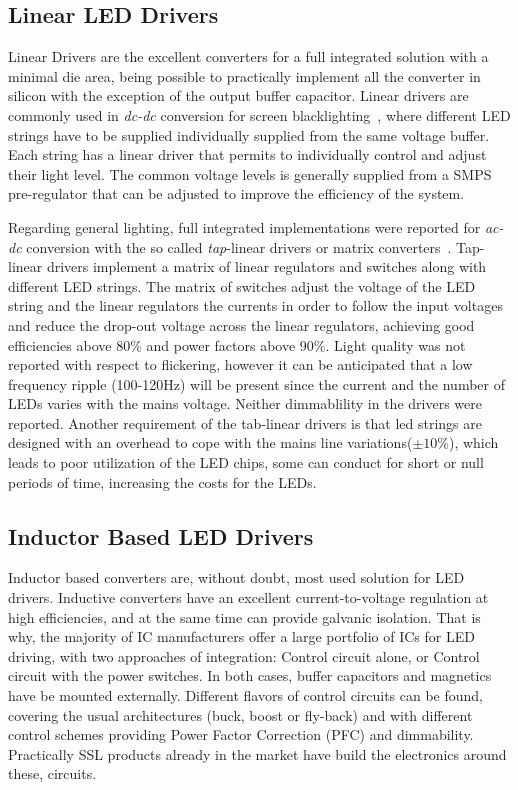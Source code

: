 \subsection{Linear LED Drivers}
Linear Drivers are the excellent converters for a full integrated solution with a minimal die area, being possible to practically implement all the converter in silicon with the exception of the output buffer capacitor. Linear drivers are commonly used in \emph{dc-dc} conversion for screen blacklighting~\cite{2007Sang-Yun,2008Tseng,2008Yuequan}, where different LED strings have to be supplied individually supplied from the same voltage buffer. Each string has a linear driver that permits to individually control and adjust their light level. The common voltage levels is generally supplied from a SMPS pre-regulator that can be adjusted to improve the efficiency of the system.

Regarding general lighting, full integrated implementations were reported for \emph{ac-dc} conversion with the so called \emph{tap}-linear drivers or matrix converters~\cite{2011Eunchul,2013Park,2014Chenyang}. Tap-linear drivers implement a matrix of linear regulators and switches along with different LED strings. The matrix of switches adjust the voltage of the LED string and the linear regulators the currents in order to follow the input voltages and reduce the drop-out voltage across the linear regulators, achieving good efficiencies above 80\% and power factors above 90\%. Light quality was not reported with respect to flickering, however it can be anticipated that a low frequency ripple (100-120Hz) will be present since the current and the number of LEDs varies with the mains voltage. Neither dimmablility in the drivers were reported. Another requirement of the tab-linear drivers is that led strings are designed with an overhead to cope with the mains line variations($\pm10\%$), which leads to poor utilization of the LED chips, some can conduct for short or null periods of time, increasing the costs for the LEDs.


\subsection{Inductor Based LED Drivers}

Inductor based converters are, without doubt, most used solution for LED drivers. Inductive converters have an excellent current-to-voltage regulation at high efficiencies, and at the same time can provide galvanic isolation. That is why, the majority of IC manufacturers offer a large portfolio of ICs for LED driving, with two approaches of integration: Control circuit alone, or Control circuit with the power switches. In both cases, buffer capacitors and magnetics have be mounted externally. Different flavors of control circuits can be found, covering the usual architectures (buck, boost or fly-back) and with different control schemes providing Power Factor Correction (PFC)  and dimmability. Practically SSL products already in the market have build the electronics around these, circuits.








